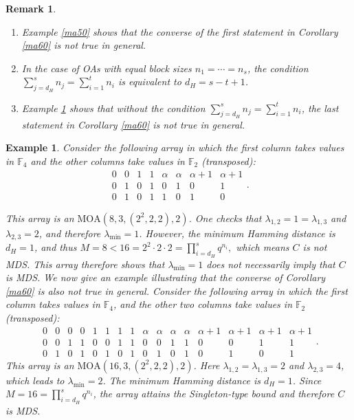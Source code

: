 \documentclass[11pt]{article}
\newtheorem{Example}[Theorem]{Example}
\newtheorem{Remark}[Theorem]{Remark}
\newtheorem{Definition and Notation}[Theorem]{Definition and Notation}
\begin{document}
\begin{Remark}\label{o-d}
\begin{enumerate}
    \item Example \ref{ma50} shows that the converse of the first statement in Corollary \ref{ma60} is not true in general. 
    \item In the case of OAs with equal block sizes $n_1=\cdots=n_s$, the condition $\sum_{j=d_H}^{s} n_j= \sum_{i=1}^{t} n_i $ is equivalent to $d_H = s - t + 1$.
    \item Example \ref{Lh} shows that without the condition $\sum_{j=d_H}^{s} n_j= \sum_{i=1}^{t} n_i $, the last statement in Corollary \ref{ma60} is not true in general. 
\end{enumerate}
\end{Remark}

\begin{Example}\label{Lh}
Consider the following array in which  the first  column takes values in $\mathbb F_4$ and the other columns take values in $\mathbb F_2$ (transposed):
$$
\begin{array}{cccccccc}
0 & 0 & 1 & 1 & \alpha & \alpha & \alpha+1 & \alpha+1 \\
0 & 1 & 0 & 1 & 0 & 1 & 0 & 1 \\
0 & 1 & 0 & 1 & 1 & 0 & 1 & 0
\end{array}.
$$

This array is an $\mathrm{MOA}(8,3,(2^2,2,2),2)$. One checks that $\lambda_{1,2}=1=\lambda_{1,3}$ and $\lambda_{2,3}=2$, and therefore $\lambda_{\min}=1$.
However, the minimum Hamming distance is $d_H=1$, and thus $M=8<16=2^{2}\cdot 2\cdot 2=\prod_{i=d_H}^{s} q^{n_i},$ which means $C$ is not MDS.
This array therefore shows that $\lambda_{\min}=1$ does not necessarily imply that $C$ is MDS. 
We now give an example illustrating that the converse of Corollary \ref{ma60} is also not true in general. Consider the following array in which the first column takes values in $\mathbb F_4$, and the other two columns take values in $\mathbb F_2$ (transposed):
$$
\begin{array}{cccccccccccccccc}
0 & 0 & 0 & 0 & 1 & 1 & 1 & 1 & \alpha & \alpha & \alpha & \alpha & \alpha+1 & \alpha+1 & \alpha+1 & \alpha+1 \\
0 & 0 & 1 & 1 & 0 & 0 & 1 & 1 & 0 & 0 & 1 & 1 & 0 & 0 & 1 & 1 \\
0 & 1 & 0 & 1 & 0 & 1 & 0 & 1 & 0 & 1 & 0 & 1 & 0 & 1 & 0 & 1
\end{array}.
$$
This array is an $\mathrm{MOA}(16,3,(2^2,2,2),2)$. Here $\lambda_{1,2}=\lambda_{1,3}=2$ and $\lambda_{2,3}=4$, which leads to $\lambda_{\min}=2$.
The minimum Hamming distance is $d_H=1$. Since $M=16=\prod_{i=d_H}^{s} q^{n_i}$, the array attains the Singleton-type bound and therefore $C$ is MDS.
\end{Example}
\end{document}
